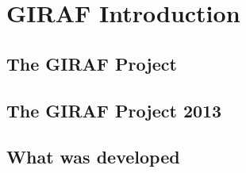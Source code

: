 \part{GIRAF Introduction} %

\chapter{The GIRAF Project}













\chapter{The GIRAF Project 2013}





% 







\chapter{What was developed}













%


%



